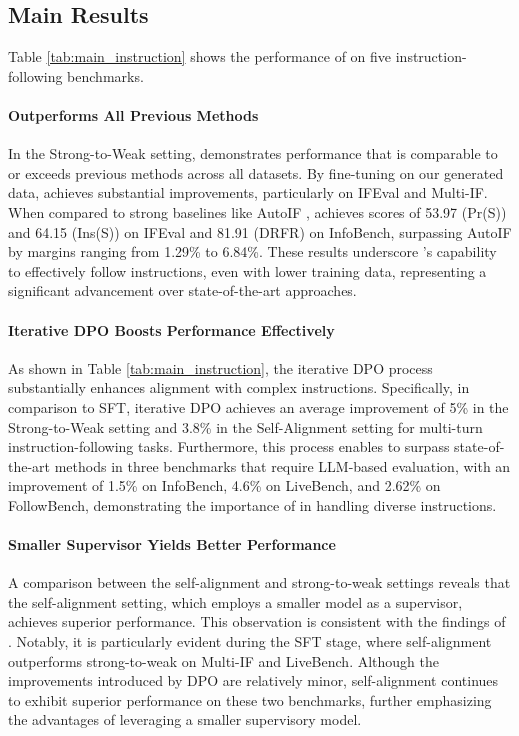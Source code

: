 \subsection{Main Results}

Table \ref{tab:main_instruction} shows the performance of \method on five instruction-following benchmarks.

\paragraph{\method Outperforms All Previous Methods}
In the Strong-to-Weak setting, \method demonstrates performance that is comparable to or exceeds previous methods across all datasets. By fine-tuning on our generated data, \method achieves substantial improvements, particularly on IFEval and Multi-IF. When compared to strong baselines like AutoIF \citep{dong2024self}, \method achieves scores of 53.97 (Pr(S)) and 64.15 (Ins(S)) on IFEval and 81.91 (DRFR) on InfoBench, surpassing AutoIF by margins ranging from 1.29\% to 6.84\%. These results underscore \method's capability to effectively follow instructions, even with lower training data, representing a significant advancement over state-of-the-art approaches.


\paragraph{Iterative DPO Boosts Performance Effectively}
As shown in Table \ref{tab:main_instruction}, the iterative DPO process substantially enhances alignment with complex instructions. Specifically, in comparison to SFT, iterative DPO achieves an average improvement of 5\% in the Strong-to-Weak setting and 3.8\% in the Self-Alignment setting for multi-turn instruction-following tasks. Furthermore, this process enables \method to surpass state-of-the-art methods in three benchmarks that require LLM-based evaluation, with an improvement of 1.5\% on InfoBench, 4.6\% on LiveBench, and 2.62\% on FollowBench, demonstrating the importance of \method in handling diverse instructions.



\paragraph{Smaller Supervisor Yields Better Performance}
A comparison between the self-alignment and strong-to-weak settings reveals that the self-alignment setting, which employs a smaller model as a supervisor, achieves superior performance. This observation is consistent with the findings of \citet{hui2024smaller}. Notably, it is particularly evident during the SFT stage, where self-alignment outperforms strong-to-weak on Multi-IF and LiveBench. Although the improvements introduced by DPO are relatively minor, self-alignment continues to exhibit superior performance on these two benchmarks, further emphasizing the advantages of leveraging a smaller supervisory model.


